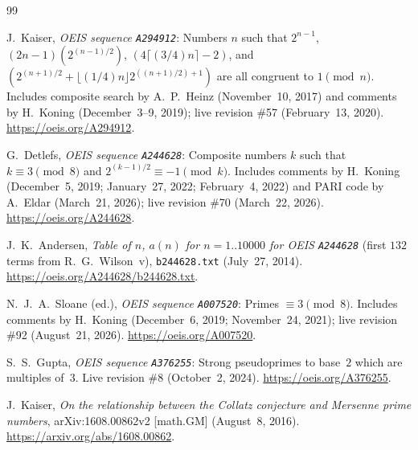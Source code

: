 \documentclass[11pt]{article}
\theoremstyle{definition}
\newcommand{\seq}[1]{\texttt{#1}}
\begin{document}
{\small
\begin{thebibliography}{99}\setlength{\itemsep}{2pt}
\raggedright

J.\ Kaiser, \emph{OEIS sequence \seq{A294912}}: Numbers $n$ such that $2^{n-1}$, $(2n-1)(2^{(n-1)/2})$, $(4\lceil(3/4)n\rceil - 2)$, and $(2^{(n+1)/2} + \lfloor(1/4)n\rfloor 2^{((n+1)/2)+1})$ are all congruent to $1 \pmod n$. Includes composite search by A.~P.\ Heinz (November~10, 2017) and comments by H.\ Koning (December~3--9, 2019); live revision \#57 (February~13, 2020). \url{https://oeis.org/A294912}.

G.\ Detlefs, \emph{OEIS sequence \seq{A244628}}: Composite numbers $k$ such that $k \equiv 3 \pmod 8$ and $2^{(k-1)/2} \equiv -1 \pmod k$. Includes comments by H.\ Koning (December~5, 2019; January~27, 2022; February~4, 2022) and PARI code by A.\ Eldar (March~21, 2026); live revision \#70 (March~22, 2026). \url{https://oeis.org/A244628}.

J.~K.\ Andersen, \emph{Table of $n$, $a(n)$ for $n = 1..10000$ for OEIS \seq{A244628}} (first $132$ terms from R.~G.\ Wilson~v), \texttt{b244628.txt} (July~27, 2014). \url{https://oeis.org/A244628/b244628.txt}.

N.~J.~A.\ Sloane (ed.), \emph{OEIS sequence \seq{A007520}}: Primes $\equiv 3 \pmod 8$. Includes comments by H.\ Koning (December~6, 2019; November~24, 2021); live revision \#92 (August~21, 2026). \url{https://oeis.org/A007520}.

S.~S.\ Gupta, \emph{OEIS sequence \seq{A376255}}: Strong pseudoprimes to base~$2$ which are multiples of~$3$. Live revision \#8 (October~2, 2024). \url{https://oeis.org/A376255}.

J.\ Kaiser, \emph{On the relationship between the Collatz conjecture and Mersenne prime numbers}, arXiv:1608.00862v2 [math.GM] (August~8, 2016). \url{https://arxiv.org/abs/1608.00862}.

\end{thebibliography}
}
\end{document}
